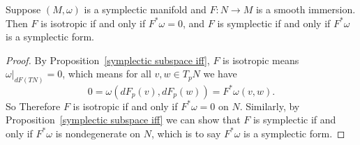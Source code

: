 \begin{proposition}\label{symplectic isotropic map iff pullback}
Suppose $(M,\omega)$ is a symplectic manifold and $F:N\to M$ is a smooth immersion. Then $F$ is isotropic if and only if $F^*\omega=0$, and $F$ is symplectic if and only if $F^*\omega$ is a symplectic form.
\end{proposition}
\begin{proof}
By Proposition~\ref{symplectic subspace iff}, $F$ is isotropic means $\omega|_{dF(TN)}=0$, which means for all $v,w\in T_pN$ we have
\[0=\omega(dF_p(v),dF_p(w))=F^*\omega(v,w).\]
So Therefore $F$ is isotropic if and only if $F^*\omega=0$ on $N$. Similarly, by Proposition~\ref{symplectic subspace iff} we can show that $F$ is symplectic if and only if $F^*\omega$ is nondegenerate on $N$, which is to say $F^*\omega$ is a symplectic form.
\end{proof}
